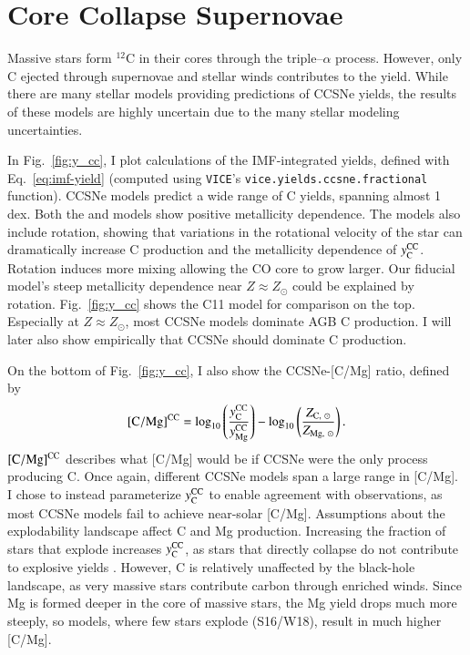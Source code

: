 \documentclass[12pt,oneside]{report}
\newcommand{\VICE}{\texttt{VICE}}
\newcommand{\Ycc}{\ensuremath{y_{\rm C}^{\rm CC}}}
\newcommand{\Yoc}{\ensuremath{y_{\rm Mg}^{\rm CC}}}
\newcommand{\sun}{\ensuremath{\odot}}
\begin{document}
\section{Core Collapse Supernovae}


Massive stars form $^{12}$C in their cores through the triple--$\alpha$ process. However, only C ejected through supernovae and stellar winds contributes to the yield. 
While there are many stellar models providing predictions of CCSNe yields, the results of these models are highly uncertain due to the many stellar modeling uncertainties. 

In Fig.~\ref{fig:y_cc}, I plot calculations of the IMF-integrated yields, defined with Eq.~\ref{eq:imf-yield} (computed using \VICE's \texttt{vice.yields.ccsne.fractional} function). 
CCSNe models predict a wide range of C yields, spanning almost 1 dex. 
Both the \citet{NKT13} and \cite{LC18} models show positive metallicity dependence. 
The \cite{LC18} models also include rotation, showing that variations in the rotational velocity of the star can dramatically increase C production and the metallicity dependence of $\Ycc$. Rotation induces more mixing allowing the CO core to grow larger. Our fiducial model's steep metallicity dependence near $Z\approx Z_\odot$ could be explained by rotation. 
Fig.~\ref{fig:y_cc} shows the C11 model for comparison on the top. Especially at $Z\approx Z_\odot$, most CCSNe models dominate AGB C production. I will later also show empirically that CCSNe should dominate C production. 

On the bottom of Fig.~\ref{fig:y_cc}, I also show the CCSNe-[C/Mg] ratio, defined by
\begin{equation}\label{eq:c_mg_cc}
    {\rm [C/Mg]^{CC}} = \log_{10}\left( \frac{\Ycc}{\Yoc}\right) - \log_{10} \left( \frac{Z_{{\rm C},\ \sun }}{Z_{{\rm Mg},\ \sun }} \right).
\end{equation}
${\rm [C/Mg]^{CC}}$ describes what [C/Mg] would be if CCSNe were the only process producing C.
Once again, different CCSNe models span a large range in [C/Mg]. 
I chose to instead parameterize $\Ycc$ to enable agreement with observations, as most CCSNe models fail to achieve near-solar [C/Mg].
Assumptions about the explodability landscape affect C and Mg production. Increasing the fraction of stars that explode increases $\Ycc$, as stars that directly collapse do not contribute to explosive yields \citep{emily+21}. However, C is relatively unaffected by the black-hole landscape, as very massive stars contribute carbon through enriched winds. Since Mg is formed deeper in the core of massive stars, the Mg yield drops much more steeply, so models, where few stars explode (S16/W18), result in much higher [C/Mg].
\end{document}
